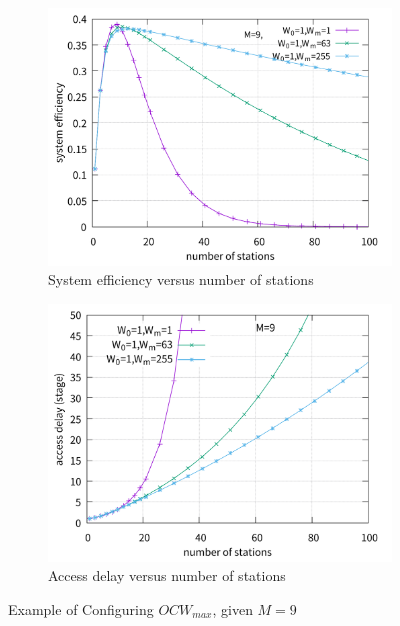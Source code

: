 \documentclass[journal]{IEEEtran}
\begin{document}
\begin{figure}[!ht]
\centering
\begin{subfigure}{0.5\textwidth}  
  \centering  
  \includegraphics[scale=0.38]{./figure/Section_perf_eval/W0/n_eff_perf_W01.pdf}  
    \caption{System efficiency versus number of stations}   
    \label{fig_n_eff_Wm}
\end{subfigure}   

\begin{subfigure}{0.5\textwidth}
	\centering
\includegraphics[scale=.38]{./figure/Section_perf_eval/W0/n_delay_perf_W01.pdf}
\caption{Access delay versus number of stations}
\label{fig_n_delay_Wm}
\end{subfigure}
\caption{Example of Configuring $OCW_{max}$, given $M=9$}
\label{fig_Wm}
\end{figure}
\end{document}
